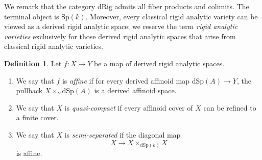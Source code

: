 \documentclass[oneside, hidelinks, 12pt, a4paper,reqno]{amsart}
\theoremstyle{plain}
\theoremstyle{definition}
\newtheorem{definition}[definition]{Definition}
\theoremstyle{plain}
\newtheorem{lemma}[lemma]{Lemma}
\newcommand{\cD}{\mathscr D}
\newcommand{\dSp}{\mathrm{dSp}}
\newcommand{\Solid}{\blacksquare}
\begin{document}

We remark that the category $\mathrm{dRig}$ admits all fiber products and colimits. The terminal object is $\mathrm{Sp}(k)$. Moreover, every classical rigid analytic variety can be viewed as a derived rigid analytic space; we reserve the term \emph{rigid analytic varieties} exclusively for those derived rigid analytic spaces that arise from classical rigid analytic varieties.

\begin{definition}
    Let $f \colon X \to Y$ be a map of derived rigid analytic spaces. 
    \begin{enumerate}
        \item We say that $f$ is \emph{affine} if for every derived affinoid map $\dSp(A) \to Y$, the pullback $X \times_Y \dSp(A)$ is a derived affinoid space. 
        \item We say that $X$ is \emph{quasi-compact} if every affinoid cover of $X$ can be refined to a finite cover. 
        \item We say that $X$ is \emph{semi-separated} if the diagonal map 
        \[
        X \to X\times_{\dSp(k)}X
        \]
        is affine. 
    \end{enumerate}
\end{definition}

\end{document}
